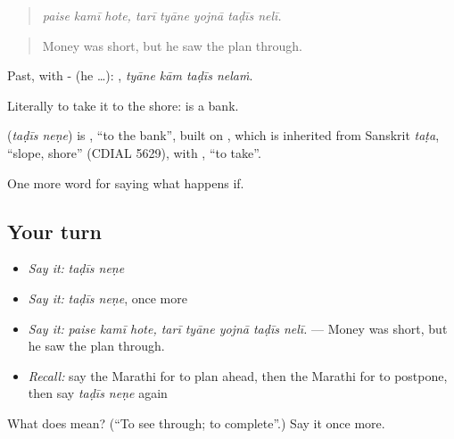 \begin{quote}
\emph{paise kamī hote, tarī tyāne yojnā taḍīs nelī.}
\end{quote}

\begin{quote}
Money was short, but he saw the plan through.
\end{quote}

Past, with - (he …):    , \emph{tyāne kām taḍīs nelaṁ}.

Literally to take it to the shore:  is a bank.

\begin{cousinweb}
\textbf{ } (\emph{taḍīs neṇe}) is , \textquotedblleft{}to the bank\textquotedblright{}, built on , which is inherited from Sanskrit \emph{taṭa}, \textquotedblleft{}slope, shore\textquotedblright{} (CDIAL 5629), with , \textquotedblleft{}to take\textquotedblright{}.
\end{cousinweb}

\begin{grammarlens}[title={What you've built}]
One more word for saying what happens if.
\end{grammarlens}

\subsection*{Your turn}
\begin{itemize}
\raggedright
  \item \emph{Say it:} \emph{taḍīs neṇe}
  \item \emph{Say it:} \emph{taḍīs neṇe}, once more
  \item \emph{Say it:} \emph{paise kamī hote, tarī tyāne yojnā taḍīs nelī.} — Money was short, but he saw the plan through.
  \item \emph{Recall:} say the Marathi for to plan ahead, then the Marathi for to postpone, then say \emph{taḍīs neṇe} again
\end{itemize}

\begin{tcolorbox}[breakable,colback=teal!4,colframe=teal!35!black,title={Before you move on}]
What does   mean? (\textquotedblleft{}To see through; to complete\textquotedblright{}.) Say it once more.
\end{tcolorbox}

